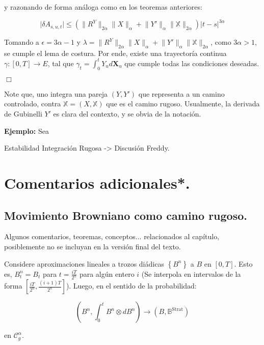 y razonando de forma análoga como en los teoremas anteriores:

\[
	\lvert \delta A_{s,u,t} \rvert \leq \left(  \lVert R^Y \rVert_{2\alpha} \lVert X \rVert_{\alpha} + \lVert Y' \rVert_{\alpha}  \lVert \mathbb{X} \rVert_{2\alpha} \right) \lvert t - s \rvert^{3\alpha}
\]

Tomando a $\epsilon = 3\alpha - 1$ y $\lambda = \lVert R^Y \rVert_{2\alpha} \lVert X \rVert_{\alpha} + \lVert Y' \rVert_{\alpha}  \lVert \mathbb{X} \rVert_{2\alpha}$, como $3 \alpha > 1$, se cumple el lema de costura. Por ende, existe una trayectoría continua $\gamma: [0,T] \rightarrow E$, tal que $\gamma_t = \int_0^t Y_u d \mathbf{X}_u$ que cumple todas las condiciones deseadas.

\begin{flushright}
	$\Box$
\end{flushright}


Note que, uno integra una pareja $(Y, Y')$ que representa a un camino controlado, contra $\mathbb{X} = (X, \mathbb{X})$ que es el camino rugoso. Usualmente, la derivada de Gubinelli $Y'$ es clara del contexto, y se obvia de la notación.

\textbf{Ejemplo:} Sea 


Estabilidad Integración Rugosa -> Discusión Freddy.
















\section{Comentarios adicionales*.}

\subsection{Movimiento Browniano como camino rugoso.}

Algunos comentarios, teoremas, conceptos... relacionados al capítulo, posiblemente no se incluyan en la versión final del texto.

\begin{prop}
	Considere aproximaciones lineales a trozos diádicas $\left\{ B^{n} \right\}$ a $B$ en $[0,T]$. Esto es, $B_t^n = B_t$ para $t = \frac{iT}{2^n}$ para algún entero $i$ (Se interpola en intervalos de la forma $\left[ \frac{iT}{2^n}, \frac{(i+1)T}{2^n} \right]$). Luego, en el sentido de la probabilidad:

	\[
		\left( B^n, \int_0^t B^n \otimes dB^n \right) \rightarrow (B, \mathbb{B}^{\text{Strat}})
	\]

	en $\mathcal{C}^{\alpha}_g$.

\end{prop}


